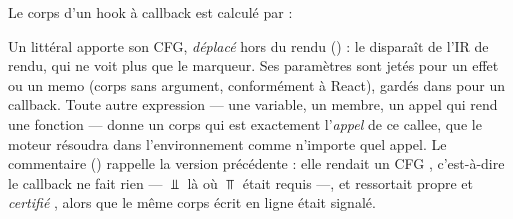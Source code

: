 Le corps d'un hook à callback est calculé par  :


Un littéral  apporte son CFG, \emph{déplacé} hors du rendu () : le  disparaît de l'IR de rendu, qui ne voit plus que le marqueur. Ses paramètres sont jetés pour un effet ou un memo (corps sans argument, conformément à React), gardés dans  pour un callback. Toute autre expression --- une variable, un membre, un appel qui rend une fonction --- donne un corps qui est exactement l'\emph{appel} de ce callee, que le moteur résoudra dans l'environnement comme n'importe quel appel. Le commentaire () rappelle la version précédente : elle rendait un CFG , c'est-à-dire \og le callback ne fait rien\fg{} --- $\Bot$ là où $\Top$ était requis ---, et  ressortait propre et \emph{certifié} , alors que le même corps écrit en ligne était signalé.

